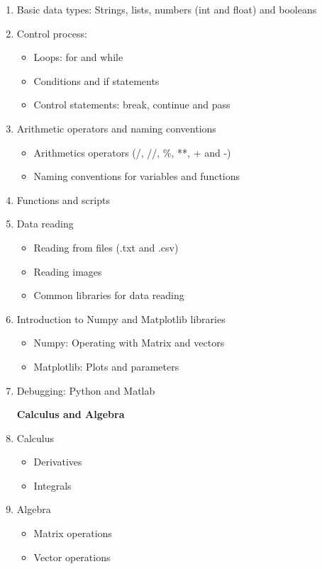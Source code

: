 \documentclass[letter,11pt]{article}
\begin{document}
\begin{flushleft}
{\begin{enumerate}
\vspace{0.3cm}
\Large \textbf{Programming skills} \large
    \item Basic data types: Strings, lists, numbers (int and float) and booleans
    \item Control process:
    \begin{itemize}
        \vspace{-0.3cm}
        \item Loops: for and while
        \item Conditions and if statements
        \item Control statements: break, continue and pass
    \end{itemize}
    \item Arithmetic operators and naming conventions
    \begin{itemize}
        \vspace{-0.3cm}
        \item Arithmetics operators (/, //, \%, **, + and -)
        \item Naming conventions for variables and functions
    \end{itemize}
    \item Functions and scripts
    \item Data reading
    \begin{itemize}
        \vspace{-0.3cm}
        \item Reading from files (.txt and .csv)
        \item Reading images
        \item Common libraries for data reading
    \end{itemize}
    \item Introduction to Numpy and Matplotlib libraries
    \begin{itemize}
        \vspace{-0.3cm}
        \item Numpy: Operating with Matrix and vectors
        \item Matplotlib: Plots and parameters 
    \end{itemize}
    \item Debugging: Python and Matlab
    
\vspace{0.2cm}
\Large \textbf{Calculus and Algebra} \large
    \item Calculus
    \begin{itemize}
        \vspace{-0.3cm}
        \item Derivatives
        \item Integrals
    \end{itemize}
    \item Algebra
    \begin{itemize}
        \vspace{-0.3cm}
        \item Matrix operations
        \item Vector operations
    \end{itemize}


\end{enumerate}}
\end{flushleft}
\end{document}

